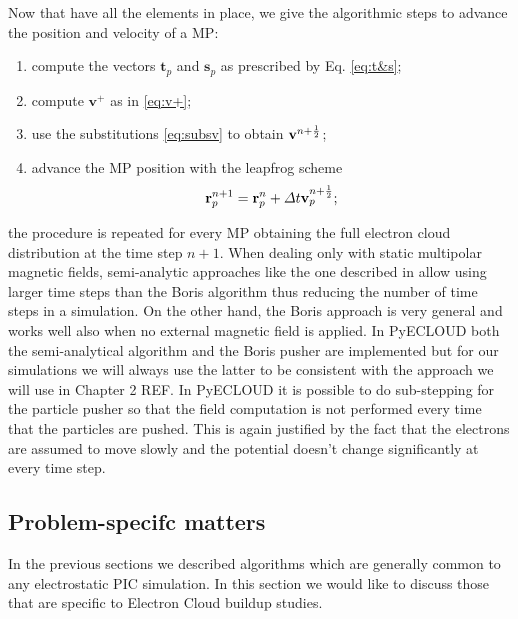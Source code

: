 Now that have all the elements in place, we give the algorithmic steps to advance the position and velocity of a MP:
\begin{enumerate}
    \item compute the vectors $\mathbf{t}_p$ and $\mathbf{s}_p$ as prescribed by Eq. \ref{eq:t&s};
    \item compute $\mathbf{v}^+$ as in \ref{eq:v+};
    \item use the substitutions \ref{eq:subsv} to obtain $\mathbf{v}^{n+\frac{1}{2}}$;
    \item advance the MP position with the leapfrog scheme $$\mathbf{r}_p^{n+1} = \mathbf{r}_p^n + \Delta t \mathbf{v}_p^{n+\frac{1}{2}};$$
\end{enumerate}
the procedure is repeated for every MP obtaining the full electron cloud distribution at the time step $n+1$.
When dealing only with static multipolar magnetic fields, semi-analytic approaches like the one described in \cite{Iadarola:thesis} allow using larger time steps than the Boris algorithm thus reducing the number of time steps in a simulation. On the other hand, the Boris approach is very general and works well also when no external magnetic field is applied. In PyECLOUD both the semi-analytical algorithm and the Boris pusher are implemented but for our simulations we will always use the latter to be consistent with the approach we will use in Chapter 2 REF.
In PyECLOUD it is possible to do sub-stepping for the particle pusher so that the field computation is not performed every time that the particles are pushed. This is again justified by the fact that the electrons are assumed to move slowly and the potential doesn't change significantly at every time step.
\subsection{Problem-specifc matters}
In the previous sections we described algorithms which are generally common to any electrostatic PIC simulation. In this section we would like to discuss those that are specific to Electron Cloud buildup studies.
